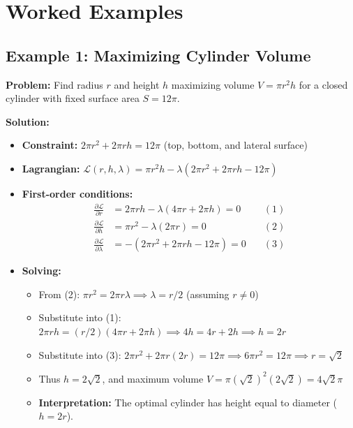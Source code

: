 \documentclass{article}
\begin{document}
\begin{center}
\end{center}

\section*{Worked Examples}
\subsection*{Example 1: Maximizing Cylinder Volume}
\textbf{Problem:} Find radius $r$ and height $h$ maximizing volume $V = \pi r^2 h$ for a closed cylinder with fixed surface area $S = 12\pi$.

\textbf{Solution:}
\begin{itemize}
\item \textbf{Constraint:} $2\pi r^2 + 2\pi rh = 12\pi$ (top, bottom, and lateral surface)
    \item \textbf{Lagrangian:} $\mathcal{L}(r, h, \lambda) = \pi r^2 h - \lambda (2\pi r^2 + 2\pi rh - 12\pi)$
    \item \textbf{First-order conditions:}
    \[
    \begin{aligned}
    \frac{\partial \mathcal{L}}{\partial r} &= 2\pi r h - \lambda (4\pi r + 2\pi h) = 0 \quad &(1)\\
    \frac{\partial \mathcal{L}}{\partial h} &= \pi r^2 - \lambda (2\pi r) = 0 \quad &(2)\\
    \frac{\partial \mathcal{L}}{\partial \lambda} &= -(2\pi r^2 + 2\pi rh - 12\pi) = 0 \quad &(3)
    \end{aligned}
    \]
    \item \textbf{Solving:}
    \begin{itemize}
        \item From (2): $\pi r^2 = 2\pi r \lambda \implies \lambda = r/2$ \quad (assuming $r \neq 0$)
        \item Substitute into (1): $2\pi r h = (r/2)(4\pi r + 2\pi h) \implies 4h = 4r + 2h \implies h = 2r$
        \item Substitute into (3): $2\pi r^2 + 2\pi r(2r) = 12\pi \implies 6\pi r^2 = 12\pi \implies r = \sqrt{2}$
        \item Thus $h = 2\sqrt{2}$, and maximum volume $V = \pi (\sqrt{2})^2 (2\sqrt{2}) = 4\sqrt{2}\pi$
    \item \textbf{Interpretation:} The optimal cylinder has height equal to diameter ($h = 2r$).
\end{itemize}
\end{itemize}
\end{document}
